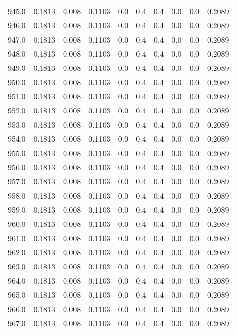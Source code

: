 \begin{longtable}{lrrrrrrrrr}
945.0 & 0.1813 & 0.008 & 0.1103 & 0.0 & 0.4 & 0.4 & 0.0 & 0.0 & 0.2089 \\
946.0 & 0.1813 & 0.008 & 0.1103 & 0.0 & 0.4 & 0.4 & 0.0 & 0.0 & 0.2089 \\
947.0 & 0.1813 & 0.008 & 0.1103 & 0.0 & 0.4 & 0.4 & 0.0 & 0.0 & 0.2089 \\
948.0 & 0.1813 & 0.008 & 0.1103 & 0.0 & 0.4 & 0.4 & 0.0 & 0.0 & 0.2089 \\
949.0 & 0.1813 & 0.008 & 0.1103 & 0.0 & 0.4 & 0.4 & 0.0 & 0.0 & 0.2089 \\
950.0 & 0.1813 & 0.008 & 0.1103 & 0.0 & 0.4 & 0.4 & 0.0 & 0.0 & 0.2089 \\
951.0 & 0.1813 & 0.008 & 0.1103 & 0.0 & 0.4 & 0.4 & 0.0 & 0.0 & 0.2089 \\
952.0 & 0.1813 & 0.008 & 0.1103 & 0.0 & 0.4 & 0.4 & 0.0 & 0.0 & 0.2089 \\
953.0 & 0.1813 & 0.008 & 0.1103 & 0.0 & 0.4 & 0.4 & 0.0 & 0.0 & 0.2089 \\
954.0 & 0.1813 & 0.008 & 0.1103 & 0.0 & 0.4 & 0.4 & 0.0 & 0.0 & 0.2089 \\
955.0 & 0.1813 & 0.008 & 0.1103 & 0.0 & 0.4 & 0.4 & 0.0 & 0.0 & 0.2089 \\
956.0 & 0.1813 & 0.008 & 0.1103 & 0.0 & 0.4 & 0.4 & 0.0 & 0.0 & 0.2089 \\
957.0 & 0.1813 & 0.008 & 0.1103 & 0.0 & 0.4 & 0.4 & 0.0 & 0.0 & 0.2089 \\
958.0 & 0.1813 & 0.008 & 0.1103 & 0.0 & 0.4 & 0.4 & 0.0 & 0.0 & 0.2089 \\
959.0 & 0.1813 & 0.008 & 0.1103 & 0.0 & 0.4 & 0.4 & 0.0 & 0.0 & 0.2089 \\
960.0 & 0.1813 & 0.008 & 0.1103 & 0.0 & 0.4 & 0.4 & 0.0 & 0.0 & 0.2089 \\
961.0 & 0.1813 & 0.008 & 0.1103 & 0.0 & 0.4 & 0.4 & 0.0 & 0.0 & 0.2089 \\
962.0 & 0.1813 & 0.008 & 0.1103 & 0.0 & 0.4 & 0.4 & 0.0 & 0.0 & 0.2089 \\
963.0 & 0.1813 & 0.008 & 0.1103 & 0.0 & 0.4 & 0.4 & 0.0 & 0.0 & 0.2089 \\
964.0 & 0.1813 & 0.008 & 0.1103 & 0.0 & 0.4 & 0.4 & 0.0 & 0.0 & 0.2089 \\
965.0 & 0.1813 & 0.008 & 0.1103 & 0.0 & 0.4 & 0.4 & 0.0 & 0.0 & 0.2089 \\
966.0 & 0.1813 & 0.008 & 0.1103 & 0.0 & 0.4 & 0.4 & 0.0 & 0.0 & 0.2089 \\
967.0 & 0.1813 & 0.008 & 0.1103 & 0.0 & 0.4 & 0.4 & 0.0 & 0.0 & 0.2089 \\

\end{longtable}
